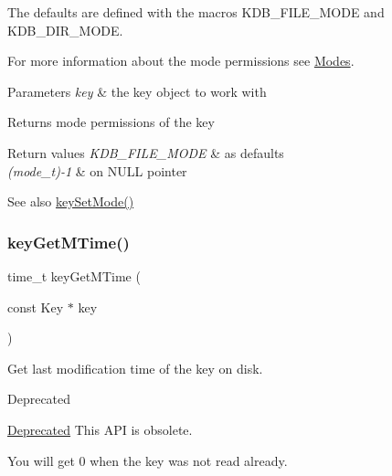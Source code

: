 The defaults are defined with the macros K\+D\+B\+\_\+\+F\+I\+L\+E\+\_\+\+M\+O\+DE and K\+D\+B\+\_\+\+D\+I\+R\+\_\+\+M\+O\+DE.

For more information about the mode permissions see \mbox{\hyperlink{group__meta_mode}{Modes}}.


\begin{DoxyParams}{Parameters}
{\em key} & the key object to work with \\
\hline
\end{DoxyParams}
\begin{DoxyReturn}{Returns}
mode permissions of the key 
\end{DoxyReturn}

\begin{DoxyRetVals}{Return values}
{\em K\+D\+B\+\_\+\+F\+I\+L\+E\+\_\+\+M\+O\+DE} & as defaults \\
\hline
{\em (mode\+\_\+t)-\/1} & on N\+U\+LL pointer \\
\hline
\end{DoxyRetVals}
\begin{DoxySeeAlso}{See also}
\mbox{\hyperlink{group__meta_ga8803037e35b9da1ce492323a88ff6bc3}{key\+Set\+Mode()}} 
\end{DoxySeeAlso}
\mbox{\label{group__meta_ga57689eb5691679071463b777ae786ae9}} 
\subsubsection{\texorpdfstring{keyGetMTime()}{keyGetMTime()}}
{\footnotesize\ttfamily time\+\_\+t key\+Get\+M\+Time (\begin{DoxyParamCaption}\item[{const Key $\ast$}]{key }\end{DoxyParamCaption})}



Get last modification time of the key on disk. 

\begin{DoxyRefDesc}{Deprecated}
\item[\mbox{\hyperlink{deprecated__deprecated000023}{Deprecated}}]This A\+PI is obsolete.\end{DoxyRefDesc}


You will get 0 when the key was not read already.

